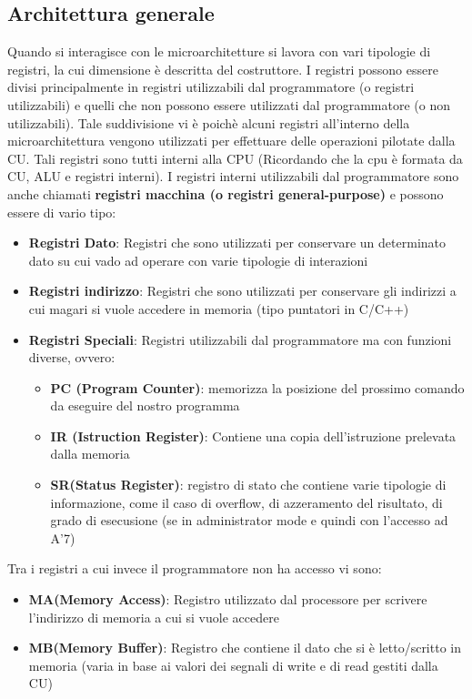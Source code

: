 \subsection{Architettura generale}
Quando si interagisce con le microarchitetture si lavora con vari tipologie di registri, la cui dimensione è descritta del costruttore.
I registri possono essere divisi principalmente in registri utilizzabili dal programmatore (o registri utilizzabili) e quelli che non possono essere utilizzati dal programmatore (o non utilizzabili). Tale suddivisione vi è poichè alcuni registri all'interno della microarchitettura vengono utilizzati per effettuare delle operazioni pilotate dalla CU. Tali registri sono tutti interni alla CPU (Ricordando che la cpu è formata da CU, ALU e registri interni). I registri interni utilizzabili dal programmatore sono anche chiamati \textbf{registri macchina (o registri general-purpose)} e possono essere di vario tipo:
\begin{itemize}
    \item \textbf{Registri Dato}: Registri che sono utilizzati per conservare un determinato dato su cui vado ad operare con varie tipologie di interazioni
    \item \textbf{Registri indirizzo}: Registri che sono utilizzati per conservare gli indirizzi a cui magari si vuole accedere in memoria (tipo puntatori in C/C++)
    \item \textbf{Registri Speciali}: Registri utilizzabili dal programmatore ma con funzioni diverse, ovvero:
    \begin{itemize}
        \item \textbf{PC (Program Counter)}: memorizza la posizione del prossimo comando da eseguire del nostro programma
        \item \textbf{IR (Istruction Register)}: Contiene una copia dell'istruzione prelevata dalla memoria 
        \item \textbf{SR(Status Register)}: registro di stato che contiene varie tipologie di informazione, come il caso di overflow, di azzeramento del risultato, di grado di esecusione (se in administrator mode e quindi con l'accesso ad A'7)
    \end{itemize}
\end{itemize}

Tra i registri a cui invece il programmatore non ha accesso vi sono:
\begin{itemize}
    \item \textbf{MA(Memory Access)}: Registro utilizzato dal processore per scrivere l'indirizzo di memoria a cui si vuole accedere
    \item \textbf{MB(Memory Buffer)}: Registro che contiene il dato che si è letto/scritto in memoria (varia in base ai valori dei segnali di write e di read gestiti dalla CU)
\end{itemize}

